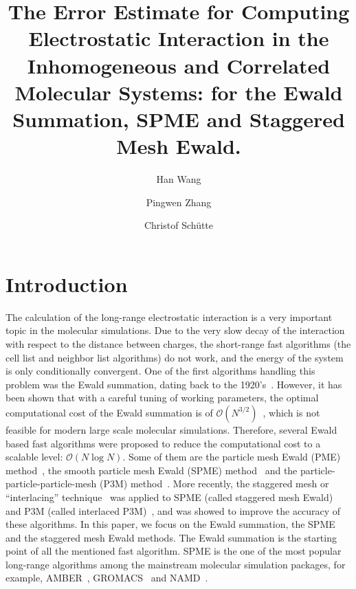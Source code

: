 \documentclass[aps,pre,preprint,unsortedaddress]{revtex4}
\begin{document}
\title{The Error Estimate for Computing Electrostatic Interaction
  in the Inhomogeneous and Correlated Molecular Systems:
  for the Ewald Summation, SPME and Staggered Mesh Ewald.
}
\author{Han Wang}
\author{Pingwen Zhang}
\author{Christof Sch\"utte}

\begin{abstract}
  
\end{abstract}

\maketitle

\section{Introduction}

The calculation of the long-range electrostatic interaction is a very
important topic in the molecular simulations.  Due to the very slow
decay of the interaction with respect to the distance between charges,
the short-range fast algorithms (the cell list and neighbor list
algorithms) do not work, and the
energy of the system is only conditionally convergent.  One of the
first algorithms handling this problem was the Ewald summation, dating
back to the 1920's~\cite{ewald1921die}.  However, it has been shown that
with a careful tuning of working parameters, the optimal computational
cost of the Ewald summation is of $\mathcal
O(N^{3/2})$~\cite{perram1988asc}, which is not feasible for modern
large scale molecular simulations.
Therefore, several Ewald based fast algorithms were proposed to reduce the
computational cost to a scalable level: $\mathcal O(N\log N)$. Some of them
are
the particle mesh Ewald (PME)
method~\cite{darden1993pme}, the smooth particle mesh Ewald (SPME)
method~\cite{essmann1995spm} and the particle-particle-particle-mesh
(P3M) method~\cite{hockney1988computer, deserno1998mue1}.
More recently, the staggered mesh or
``interlacing'' technique~\cite{chen1974reduction,eastwood1976optimal}
was applied to SPME
(called staggered mesh Ewald)~\cite{cerutti2009staggered} and P3M
(called interlaced P3M)~\cite{neelov2010interlaced}, and was showed to
improve the accuracy of these algorithms.
In this paper, we focus on the Ewald summation, the SPME and
the staggered mesh Ewald methods. The Ewald summation is the starting
point of all the mentioned fast algorithm. SPME
is the one of the most popular long-range algorithms among
the mainstream molecular simulation packages, for example,
AMBER~\cite{case2005amber}, GROMACS~\cite{van2005gromacs,
  hess2008gromacs} and NAMD~\cite{phillips2005scalable}.
\end{document}
